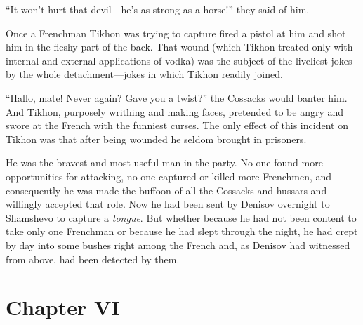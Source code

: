 ``It won't hurt that devil---he's as strong as a horse!'' they
said of him.

Once a Frenchman Tikhon was trying to capture fired a pistol at
him and shot him in the fleshy part of the back. That wound
(which Tikhon treated only with internal and external
applications of vodka) was the subject of the liveliest jokes by
the whole detachment---jokes in which Tikhon readily joined.

``Hallo, mate! Never again? Gave you a twist?'' the Cossacks
would banter him. And Tikhon, purposely writhing and making
faces, pretended to be angry and swore at the French with the
funniest curses. The only effect of this incident on Tikhon was
that after being wounded he seldom brought in prisoners.

He was the bravest and most useful man in the party. No one found
more opportunities for attacking, no one captured or killed more
Frenchmen, and consequently he was made the buffoon of all the
Cossacks and hussars and willingly accepted that role. Now he had
been sent by Denisov overnight to Shamshevo to capture a
\emph{tongue}. But whether because he had not been content to
take only one Frenchman or because he had slept through the
night, he had crept by day into some bushes right among the
French and, as Denisov had witnessed from above, had been
detected by them.


\chapter*{Chapter VI} \ifaudio {}
\fi

